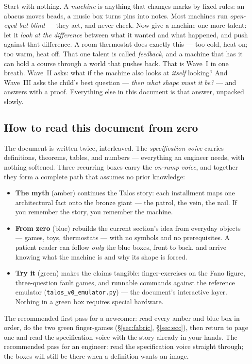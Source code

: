 \begin{zerobox}
Start with nothing. A \emph{machine} is anything that changes marks by fixed
rules: an abacus moves beads, a music box turns pins into notes. Most
machines run \emph{open-eyed but blind} --- they act, and never check. Now
give a machine one more talent: let it \emph{look at the difference} between
what it wanted and what happened, and push against that difference. A room
thermostat does exactly this --- too cold, heat on; too warm, heat off. That
one talent is called \emph{feedback}, and a machine that has it can hold a
course through a world that pushes back. That is Wave~I in one breath. Wave~II
asks: what if the machine also looks at \emph{itself} looking? And Wave~III
asks the child's best question --- \emph{then what shape must it be?} --- and
answers with a proof. Everything else in this document is that answer,
unpacked slowly.
\end{zerobox}

\subsection{How to read this document from zero}
\label{subsec:howtoread}

The document is written twice, interleaved. The \emph{specification voice}
carries definitions, theorems, tables, and numbers --- everything an engineer
needs, with nothing softened. Three recurring boxes carry the \emph{on-ramp
voice}, and together they form a complete path that assumes no prior
knowledge:

\begin{itemize}[leftmargin=1.5em,itemsep=1pt]
  \item \textbf{\textcolor{talosamber!85!black}{The myth}} (amber) continues
        the Talos story: each installment maps one architectural fact onto
        the bronze giant --- the patrol, the vein, the nail. If you remember
        the story, you remember the machine.
  \item \textbf{\textcolor{plosblue!70!black}{From zero}} (blue) rebuilds the
        current section's idea from everyday objects --- games, toys,
        thermostats --- with no symbols and no prerequisites. A patient
        reader can follow \emph{only} the blue boxes, front to back, and
        arrive knowing what the machine is and why its shape is forced.
  \item \textbf{\textcolor{green!45!black}{Try it}} (green) makes the claims
        tangible: finger-exercises on the Fano figure, three-question fault
        games, and runnable commands against the reference emulator
        (\texttt{talos\_v0\_emulator.py}) --- the document's interactive
        layer. Nothing in a green box requires special hardware.
\end{itemize}

The recommended first pass for a newcomer: read every amber and blue box in
order, do the two green finger-games (\S\ref{sec:fabric}, \S\ref{sec:ecc}),
then return to page one and read the specification voice with the story
already in your hands. The recommended pass for an engineer: read the
specification voice straight through; the boxes will still be there when a
definition wants an image.
